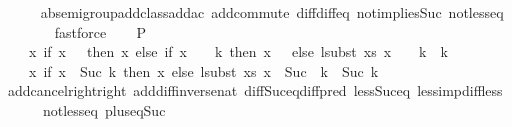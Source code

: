 \begin{isabellebody}
\ \ \ \ \isamarkupfalse%
\ ab{\isacharunderscore}{\kern0pt}semigroup{\isacharunderscore}{\kern0pt}add{\isacharunderscore}{\kern0pt}class{\isachardot}{\kern0pt}add{\isacharunderscore}{\kern0pt}ac{\isacharparenleft}{\kern0pt}{}{\isacharparenright}{\kern0pt}\ add{\isachardot}{\kern0pt}commute\ diff{\isacharunderscore}{\kern0pt}diff{\isacharunderscore}{\kern0pt}eq\ not{}{\isacharunderscore}{\kern0pt}implies{\isacharunderscore}{\kern0pt}Suc\ not{\isacharunderscore}{\kern0pt}less{\isacharunderscore}{\kern0pt}eq\isanewline
\ \ \ \ \ \ \isamarkupfalse%
\ fastforce\isanewline
\isanewline
\ \ \isamarkupfalse%
\ P{}{\isacharcolon}{\kern0pt}\isanewline
\ \ \ \ {\isachardoublequoteopen}{\isacharparenleft}{\kern0pt}{\isasymlambda}x{\isachardot}{\kern0pt}\ if\ x\ {\isacharequal}{\kern0pt}\ {}\ then\ x\ else\ {\isacharparenleft}{\kern0pt}if\ x\ {\isacharminus}{\kern0pt}\ {}\ {\isacharless}{\kern0pt}\ k\ then\ x\ {\isacharminus}{\kern0pt}\ {}\ else\ lsubst\ xs\ {\isacharparenleft}{\kern0pt}x\ {\isacharminus}{\kern0pt}\ {}\ {\isacharminus}{\kern0pt}\ k{\isacharparenright}{\kern0pt}\ {\isacharplus}{\kern0pt}\ k{\isacharparenright}{\kern0pt}\ {\isacharplus}{\kern0pt}\ {}{\isacharparenright}{\kern0pt}\ {\isacharequal}{\kern0pt}\isanewline
\ \ \ \ {\isacharparenleft}{\kern0pt}{\isasymlambda}x{\isachardot}{\kern0pt}\ if\ x\ {\isacharless}{\kern0pt}\ Suc\ k\ then\ x\ else\ lsubst\ xs\ {\isacharparenleft}{\kern0pt}x\ {\isacharminus}{\kern0pt}\ {\isacharparenleft}{\kern0pt}Suc\ \ k{\isacharparenright}{\kern0pt}{\isacharparenright}{\kern0pt}\ {\isacharplus}{\kern0pt}\ {\isacharparenleft}{\kern0pt}Suc\ k{\isacharparenright}{\kern0pt}{\isacharparenright}{\kern0pt}{\isachardoublequoteclose}\isanewline
\ \ \ \ \isamarkupfalse%
\ add{\isacharunderscore}{\kern0pt}cancel{\isacharunderscore}{\kern0pt}right{\isacharunderscore}{\kern0pt}right\ add{\isacharunderscore}{\kern0pt}diff{\isacharunderscore}{\kern0pt}inverse{\isacharunderscore}{\kern0pt}nat\ diff{\isacharunderscore}{\kern0pt}Suc{\isacharunderscore}{\kern0pt}eq{\isacharunderscore}{\kern0pt}diff{\isacharunderscore}{\kern0pt}pred\ less{\isacharunderscore}{\kern0pt}Suc{\isacharunderscore}{\kern0pt}eq\ less{\isacharunderscore}{\kern0pt}imp{\isacharunderscore}{\kern0pt}diff{\isacharunderscore}{\kern0pt}less\isanewline
\ \ \ \ \ \ not{\isacharunderscore}{\kern0pt}less{\isacharunderscore}{\kern0pt}eq\ plus{\isacharunderscore}{\kern0pt}{}{\isacharunderscore}{\kern0pt}eq{\isacharunderscore}{\kern0pt}Suc\ \isamarkupfalse%

\end{isabellebody}
